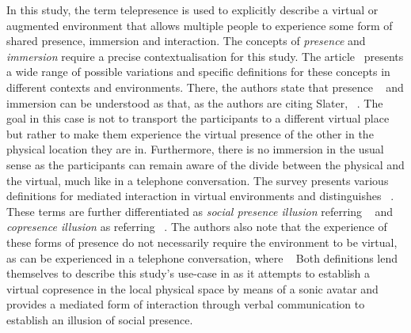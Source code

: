 In this study, the term telepresence is used to explicitly describe a virtual or augmented environment that allows multiple people to experience some form of shared presence, immersion and interaction.
The concepts of \emph{presence} and \emph{immersion} require a precise contextualisation for this study.
The article~ presents a wide range of possible variations and specific definitions for these concepts in different contexts and environments.
There, the authors state that presence ~\parencite[2]{surveyOfPresence} and immersion can be understood as  that, as the authors are citing Slater, ~\parencite[3]{surveyOfPresence}.
The goal in this case is not to transport the participants to a different virtual place but rather to make them experience the virtual presence of the other in the physical location they are in.
Furthermore, there is no immersion in the usual sense as the participants can remain aware of the divide between the physical and the virtual, much like in a telephone conversation.
The survey presents various definitions for mediated interaction in virtual environments and distinguishes ~\parencite[4]{surveyOfPresence}.
These terms are further differentiated as \emph{social presence illusion} referring ~\parencite[4]{surveyOfPresence} and \emph{copresence illusion} as referring ~\parencite[5]{surveyOfPresence}.
The authors also note that the experience of these forms of presence do not necessarily require the environment to be virtual, as can be experienced in a telephone conversation, where ~\parencite[5]{surveyOfPresence}
Both definitions lend themselves to describe this study's use-case in as it attempts to establish a virtual copresence in the local physical space by means of a sonic avatar and provides a mediated form of interaction through verbal communication to establish an illusion of social presence.

